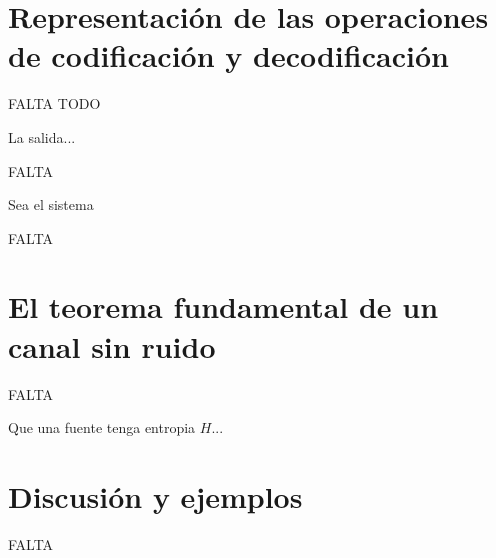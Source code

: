 \chapter{Representaci\'{o}n de las operaciones de codificaci\'{o}n y decodificaci\'{o}n}
\label{sec:8}

FALTA TODO

\begin{theorem}
\label{th:7}
La salida...
\end{theorem}

FALTA

\begin{theorem}
\label{th:8}
Sea el sistema
\end{theorem}

FALTA

\clearpage

\chapter{El teorema fundamental de un canal sin ruido}
\label{sec:9}

FALTA

\begin{theorem}
\label{th:9}
Que una fuente tenga entropia $H$...
\end{theorem}

\clearpage

\chapter{Discusi\'{o}n y ejemplos}
\label{sec:19}

FALTA

